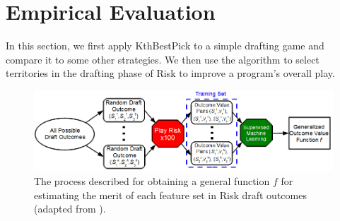 \documentclass[letterpaper]{article}
\newtheorem{theorem1}{Theorem}
\numberwithin{equation}{section}
\numberwithin{theorem}{section}
\numberwithin{lemma}{section}
\numberwithin{df}{section}
\begin{document}

%

\section{Empirical Evaluation}

In this section, we first apply KthBestPick to a simple drafting game and compare it to some other strategies.  We then use the algorithm to select territories in the drafting phase of Risk to improve a program's overall play.

\begin{figure}[t]
	\centering
	\includegraphics[scale=0.5]{figs/MachineLearner.png}
	\caption{The process described for obtaining a general function $f$ for estimating the merit of each feature set in Risk draft outcomes (adapted from \cite[Figure 5.1]{GregLeeThesis}).}
	\label{fig:MachLearn}
\end{figure}
\end{document}
